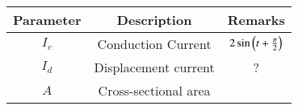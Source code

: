 \setlength{\arrayrulewidth}{0.3mm}
\setlength{\tabcolsep}{20pt}
\renewcommand{\arraystretch}{1.5}

\begin{tabular}{|c|c|c|}
\hline
Parameter& Description & Remarks\\
\hline
$I_c$ & Conduction Current & $2\sin\left(t + \frac{\pi}{2}\right)$\\
\hline
$I_d$ & Displacement current & ?\\
\hline
$A$ & Cross-sectional area & \\
\hline
\end{tabular}
